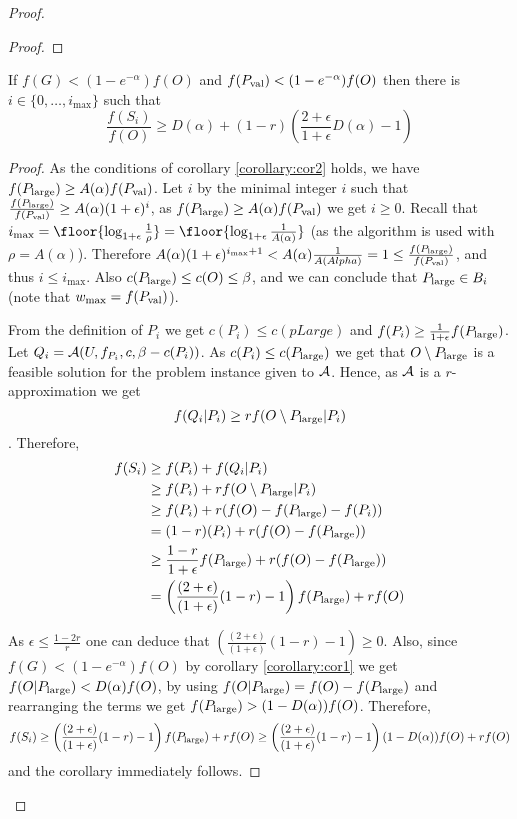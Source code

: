 \begin{proof}
\begin{proof}
			
		\end{proof}

	\begin{corollary}
		\label{corollary:cor3}
			If $f(G)< (1-e^{-\alpha})f(O)$ and $f(P_{\text{val}}) < (1-e^{-\alpha})f(O)$ then
			there is $i\in \{0, \ldots, i_{\max}\}$ such that 
		$$\frac{f(S_i)}{f(O)} \geq D(\alpha) + (1-r)\left( \frac{2+\epsilon}{1+\epsilon} D(\alpha) -1 \right)$$
	\end{corollary}
\begin{proof}
		As the conditions of corollary \ref{corollary:cor2} holds, we have
		$f(P_{\text{large}}) \geq A(\alpha) f(P_{\text{val}})$.
		 Let $i$ by the minimal integer $i$ such
		that $\frac{f(P_{\text{large}})}{f(P_{\text{val}})}\geq A(\alpha)(1+\epsilon) ^i$, as $f(P_{\text{large}}) \geq A(\alpha) f(P_{\text{val}})$ we get $i\geq 0$. 
		Recall that $i_{\max}= \floor{\log_{1+\epsilon} \frac{1}{\rho} } = 
		\floor{\log_{1+\epsilon} \frac{1}{A(\alpha)}} $ (as the algorithm is used 
			with $\rho=A(\alpha)$). 
			Therefore
			$A(\alpha) (1+\epsilon) ^{i_{\max} +1} < A(\alpha) \frac{1}{A(Alpha) } = 1 \leq \frac{f(P_{\text{large}})}{f(P_{\text{val}})}$, and thus $i\leq i_{\max}$. 
			Also $c(P_{\text{large}}) \leq c(O) \leq \beta$, and we can conclude that 
			$P_{\text{large}} \in B_i$ (note that $w_{\max} = f(P_{\text{val}})$).
			
			From the definition of $P_i$ we get $c(P_i)\leq c(pLarge)$ and 
			$f(P_i) \geq \frac{1}{1+\epsilon} f(P_{\text{large}})$. 
			Let $Q_i  =  \mathcal{A}(U, f_{P_i}, c, \beta - c(P_i))$. 
			As $c(P_i) \leq c(P_{\text{large}})$ we get that $O\setminus P_{\text{large}}$ 
			is a feasible solution for the problem instance given to $\mathcal{A}$. 
			Hence, as $\mathcal{A}$ is a $r$-approximation we get
			$$f(Q_i | P_i) \geq r f(O\setminus P_{\text{large}}| P_i)$$. 
			Therefore,
			\begin{align*}
			f(S_{i}) 
			&
			\geq f(P_i) + f(Q_i|P_i)
			\\ & 
			\geq f(P_i) + r f(O \setminus P_{\text{large}} | P_i)
			\\ & 
			\geq f(P_i) + r(f(O) - f(P_{\text{large}}) - f(P_i))
			\\ & 
			= (1-r)(P_i) + r(f(O) - f(P_{\text{large}}))
			\\ & 
			\geq \frac{1-r}{1 + \epsilon}f(P_{\text{large}}) + r(f(O) - f(P_{\text{large}}))
			\\ &
			= \left(
			\frac{(2 + \epsilon)}{(1 + \epsilon)}(1-r) - 1
			\right)
			f(P_{\text{large}})
			+ rf(O)
			\label{eq:sub:bucket}
			\end{align*}
			
			As $\epsilon\leq \frac{1-2r}{r}$ one can deduce that 
			$\left(
			\frac{(2 + \epsilon)}{(1 + \epsilon)}(1-r) - 1
			\right) \geq 0$.
			Also, since $f(G)< (1-e^{-\alpha})f(O)$ by corollary \ref{corollary:cor1} we 
			get $f(O|P_{\text{large}})  <D(\alpha)f(O)$, by using $f(O|P_{\text{large}})= f(O) -f(P_{\text{large}})$
			and rearranging  the terms we get 
			$f(P_{\text{large}})> (1-D(\alpha)) f(O)$.
			Therefore,
			$$f(S_i) \geq 
			\left(
			\frac{(2 + \epsilon)}{(1 + \epsilon)}(1-r) - 1
			\right)
			f(P_{\text{large}})
			+ rf(O) \geq 
				\left(
			\frac{(2 + \epsilon)}{(1 + \epsilon)}(1-r) - 1
			\right) (1-D(\alpha ) )f(O) +rf(O)$$
			and the corollary immediately follows. 
			

\end{proof}
\end{proof}
